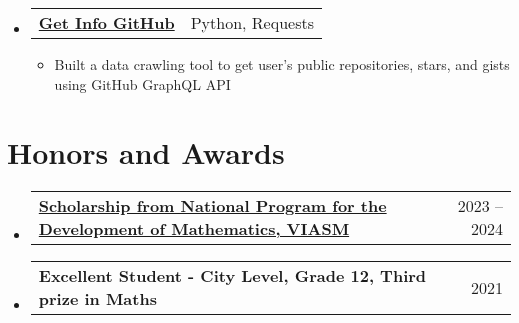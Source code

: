 \documentclass[letterpaper,11pt]{article}
\makeatletter
\newcommand{\subheading}[2]{
    \normalsize
    \begin{tabular*}{0.97\textwidth}[t]{l@{\extracolsep{\fill}}r}
      \textbf{#1} & #2 \\
    \end{tabular*}
    \vspace{-2pt}
}
\makeatother
\begin{document}
\begin{itemize}
    \item \subheading{\href{https://github.com/ngntrgduc/get-info-github}{Get Info GitHub \faGithub}}
        {Python, Requests}
        \begin{itemize}
            \item Built a data crawling tool to get user's public repositories, stars, and gists using GitHub GraphQL API
        \end{itemize}
    

    

\end{itemize}






\section{Honors and Awards}
\begin{itemize}
    \item \subheading{\href{https://viasm.edu.vn/hoat-dong-khoa-hoc/tin-tuc/chi-tiet/hoc-bong-chuong-trinh-toan-nam-hoc-2023-2024}{\small Scholarship from National Program for the Development of Mathematics, VIASM \faExternalLink}}{2023 -- 2024}
    
    \item \subheading{\small Excellent Student - City Level, Grade 12, Third prize in Maths}{2021}
\end{itemize}
\end{document}
